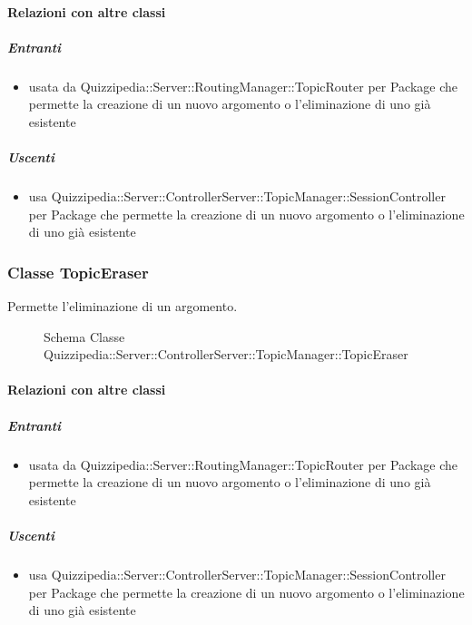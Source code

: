 \paragraph{Relazioni con altre classi}
\subparagraph{Entranti}
\begin{itemize}
\item usata da Quizzipedia::Server::RoutingManager::TopicRouter per Package che permette la creazione di un nuovo argomento o l'eliminazione di uno già esistente
\end{itemize}
\subparagraph{Uscenti}
\begin{itemize}
\item usa Quizzipedia::Server::ControllerServer::TopicManager::SessionController per Package che permette la creazione di un nuovo argomento o l'eliminazione di uno già esistente
\end{itemize}
\subsubsection{Classe TopicEraser}
Permette l'eliminazione di un argomento.
\begin{figure}[H]
\centering
\noindent{}
\caption[Schema Classe TopicEraser]{Schema Classe Quizzipedia::Server::ControllerServer::TopicManager::TopicEraser}
\end{figure}
\paragraph{Relazioni con altre classi}
\subparagraph{Entranti}
\begin{itemize}
\item usata da Quizzipedia::Server::RoutingManager::TopicRouter per Package che permette la creazione di un nuovo argomento o l'eliminazione di uno già esistente
\end{itemize}
\subparagraph{Uscenti}
\begin{itemize}
\item usa Quizzipedia::Server::ControllerServer::TopicManager::SessionController per Package che permette la creazione di un nuovo argomento o l'eliminazione di uno già esistente
\end{itemize}
